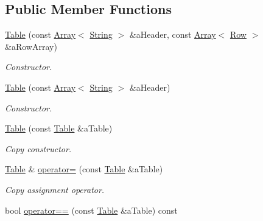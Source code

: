 \subsection*{Public Member Functions}
\begin{DoxyCompactItemize}
\item 
\mbox{\hyperlink{classlibrary_1_1core_1_1ctnr_1_1_table_a5b11121caa4288c3da642af7c6a5a632}{Table}} (const \mbox{\hyperlink{classlibrary_1_1core_1_1ctnr_1_1_array}{Array}}$<$ \mbox{\hyperlink{classlibrary_1_1core_1_1types_1_1_string}{String}} $>$ \&a\+Header, const \mbox{\hyperlink{classlibrary_1_1core_1_1ctnr_1_1_array}{Array}}$<$ \mbox{\hyperlink{classlibrary_1_1core_1_1ctnr_1_1table_1_1_row}{Row}} $>$ \&a\+Row\+Array)
\begin{DoxyCompactList}\small\item\em Constructor. \end{DoxyCompactList}\item 
\mbox{\hyperlink{classlibrary_1_1core_1_1ctnr_1_1_table_a95e14e9c464aa1881b86cefb7770aa62}{Table}} (const \mbox{\hyperlink{classlibrary_1_1core_1_1ctnr_1_1_array}{Array}}$<$ \mbox{\hyperlink{classlibrary_1_1core_1_1types_1_1_string}{String}} $>$ \&a\+Header)
\begin{DoxyCompactList}\small\item\em Constructor. \end{DoxyCompactList}\item 
\mbox{\hyperlink{classlibrary_1_1core_1_1ctnr_1_1_table_afaaf450a1a4949b48b6290460137921e}{Table}} (const \mbox{\hyperlink{classlibrary_1_1core_1_1ctnr_1_1_table}{Table}} \&a\+Table)
\begin{DoxyCompactList}\small\item\em Copy constructor. \end{DoxyCompactList}\item 
\mbox{\hyperlink{classlibrary_1_1core_1_1ctnr_1_1_table}{Table}} \& \mbox{\hyperlink{classlibrary_1_1core_1_1ctnr_1_1_table_a77d62f9695b47e5d6b57554ccbaefc9a}{operator=}} (const \mbox{\hyperlink{classlibrary_1_1core_1_1ctnr_1_1_table}{Table}} \&a\+Table)
\begin{DoxyCompactList}\small\item\em Copy assignment operator. \end{DoxyCompactList}\item 
bool \mbox{\hyperlink{classlibrary_1_1core_1_1ctnr_1_1_table_ad74691bcfc56002a7eb5fc76f2a7cb9d}{operator==}} (const \mbox{\hyperlink{classlibrary_1_1core_1_1ctnr_1_1_table}{Table}} \&a\+Table) const

\end{DoxyCompactItemize}
